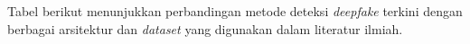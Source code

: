\begin{center}
\end{center}
\clearpage

\newpage


Tabel berikut menunjukkan perbandingan metode deteksi \textit{deepfake} terkini dengan berbagai arsitektur dan \textit{dataset} yang digunakan dalam literatur ilmiah.


